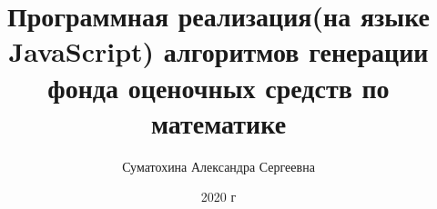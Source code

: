 

\title{Программная реализация(на языке JavaScript) алгоритмов генерации фонда оценочных средств по математике}
\date{2020 г}
\author{Суматохина Александра Сергеевна}
\maketitle
\tableofcontents





